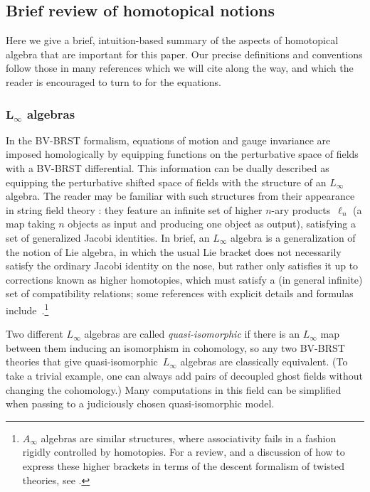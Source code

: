\documentclass[10pt,a4paper]{amsart}
\numberwithin{equation}{section}
\theoremstyle{definition}
\begin{document}
\subsection{Brief review of homotopical notions} \label{sec: background}
Here we give a brief, intuition-based summary of the aspects of homotopical algebra that are important for this paper. Our precise definitions and conventions follow those in many references which we will cite along the way, and which the reader is encouraged to turn to for the equations.

\subsubsection[L\_infty algebras]{$\boldsymbol{ L_{\infty}}$ algebras}
In the BV-BRST formalism, equations of motion and gauge invariance are imposed homologically by equipping functions on the perturbative space of fields with a BV-BRST differential. This information can be dually described as equipping the perturbative shifted space of fields with the structure of an $L_\infty$ algebra. The reader may be familiar with such structures from their appearance in string field theory \cite{Gaberdiel:1997ia,Zwiebach:1992ie}: they feature an infinite set of higher $n$-ary products~$\ell_n$ (a map taking $n$ objects as input and producing one object as output), satisfying a set of generalized Jacobi identities. In brief, an $L_{\infty}$ algebra is a generalization of the notion of Lie algebra, in which the usual Lie bracket does not necessarily satisfy the ordinary Jacobi identity on the nose, but rather only satisfies it up to corrections known as higher homotopies, which must satisfy a (in general infinite) set of compatibility relations; some references with explicit details and formulas include~\cite{Jurco:2020yyu,Jurco:2018sby}.\footnote{$A_{\infty}$ algebras are similar structures, where associativity fails in a fashion rigidly controlled by homotopies. For a review, and a discussion of how to express these higher brackets in terms of the descent formalism of twisted theories, see \cite{Garner:2022its}.}

Two different $L_{\infty}$ algebras are called \textit{quasi-isomorphic} if there is an $L_\infty$ map between them inducing an isomorphism in cohomology, so any two BV-BRST theories that give quasi-isomorphic~$L_{\infty}$ algebras are classically equivalent. (To take a trivial example, one can always add pairs of decoupled ghost fields without changing the cohomology.) Many computations in this field can be simplified when passing to a judiciously chosen quasi-isomorphic model.
\end{document}
